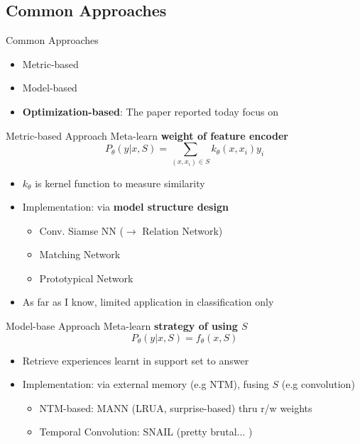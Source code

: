 \documentclass{beamer}
\begin{document}
\subsection{Common Approaches}
\begin{frame}{Common Approaches}
  \begin{itemize}
    \item Metric-based
    \item Model-based
    \item \textbf{Optimization-based}: The paper reported today focus on
  \end{itemize}
\end{frame}

\begin{frame}{Metric-based Approach}
  Meta-learn \textbf{weight of feature encoder}
  \[ P_\theta (y|x,S) = \sum_{(x,x_i) \in S} k_\theta (x,x_i) y_i \]
  \begin{itemize}
    \item $k_\theta$ is kernel function to measure similarity
    \item Implementation: via \textbf{model structure design}
      \begin{itemize}
        \item Conv. Siamse NN ($\rightarrow$ Relation Network)
        \item Matching Network
        \item Prototypical Network
      \end{itemize}
    \item As far as I know, limited application in classification only
  \end{itemize}
\end{frame}

\begin{frame}{Model-base Approach}
  Meta-learn \textbf{strategy of using $S$}
  \[ P_\theta(y|x,S) = f_\theta(x,S) \]
  \begin{itemize}
    \item Retrieve experiences learnt in support set to answer
    \item Implementation: via external memory (e.g NTM), fusing $S$ (e.g convolution)
    \begin{itemize}
      \item NTM-based: MANN (LRUA, surprise-based) thru r/w weights
      \item Temporal Convolution: SNAIL (pretty brutal... )
    \end{itemize}
\end{itemize}
\end{frame}
\end{document}
